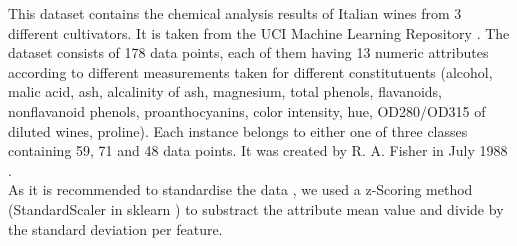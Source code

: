 
This dataset contains the chemical analysis results of Italian wines from 3 different cultivators. It is taken from the UCI Machine Learning Repository \cite{Dua2019}. 
The dataset consists of 178 data points, each of them having 13 numeric attributes according to different measurements taken for different constitutuents (alcohol, malic acid, ash, alcalinity of ash, magnesium, total phenols, flavanoids, nonflavanoid phenols, proanthocyanins, color intensity, hue, OD280/OD315 of diluted wines, proline). Each instance belongs to either one of three classes containing 59, 71 and 48 data points. 
It was created by R. A. Fisher in July 1988 \cite{scikitlearn}.\\ 
As it is recommended to standardise the data \cite{Dua2019}, we used a z-Scoring method (StandardScaler in sklearn \cite{scikitlearn}) to substract the attribute mean value and divide by the standard deviation per feature. 